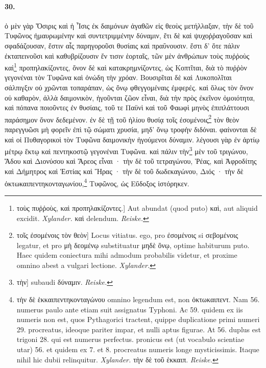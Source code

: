 \documentclass[a4paper, 11pt, oneside, polutonikogreek, german, landscape]{article}
\begin{document}
\paragraph{30.}
ὁ μὲν γὰρ Ὄσιρις καὶ ἡ Ἶσις ἐκ δαιμόνων ἀγαθῶν εἰς θεοὺς μετήλλαξαν, τὴν δὲ τοῦ Τυφῶνος ἠμαυρωμένην καὶ συντετριμμένην δύναμιν, ἔτι δὲ καὶ ψυχοῤῥαγοῦσαν καὶ σφαδάζουσαν, ἔστιν αἷς παρηγοροῦσι θυσίαις καὶ πραΰνουσιν. ἔστι δ' ὅτε πάλιν ἐκταπεινοῦσι καὶ καθυβρίζουσιν ἔν τισιν ἑορταῖς, τῶν μὲν ἀνθρώπων τοὺς πυῤῥοὺς καὶ\footnote{τοὺς πυῤῥοὺς, καὶ προπηλακίζοντες.] Aut abundat (quod puto) καὶ, aut aliquid excidit. \emph{Xylander.} καὶ delendum. \emph{Reiske.}} προπηλακίζοντες, ὄνον δὲ καὶ κατακρημνίζοντες, ὡς Κοπτῖται, διὰ τὸ πυῤῥὸν γεγονέναι τὸν Τυφῶνα καὶ ὀνώδη τὴν χρόαν. Βουσιρῖται δὲ καὶ Λυκοπολῖται σάλπιγξιν οὐ χρῶνται τοπαράπαν, ὡς ὄνῳ φθεγγομέναις ἐμφερές. καὶ ὅλως τὸν ὄνον οὐ καθαρὸν, ἀλλὰ δαιμονικὸν, ἡγοῦνται ζῶον εἶναι, διὰ τὴν πρὸς ἐκεῖνον ὁμοιότητα, καὶ πόπανα ποιοῦντες ἐν θυσίαις, τοῦ τε Παϋνὶ καὶ τοῦ Φαωφὶ μηνὸς ἐπιπλάττουσι παράσημον ὄνον δεδεμένον. ἐν δὲ τῇ τοῦ ἡλίου θυσίᾳ τοῖς ἐσομένοις\footnote{τοῖς ἐσομένοις τὸν θεὸν] Locus vitiatus. ego, pro ἐσομένοις si σεβομένοις legatur, et pro μὴ δεομένῳ substituatur μηδὲ ὂνῳ, optime habiturum puto. Haec quidem coniectura mihi admodum probabilis videtur, et proxime omnino abest a vulgari lectione. \emph{Xylander.}} τὸν θεὸν παρεγγυῶσι μὴ φορεῖν ἐπὶ τῷ σώματι χρυσία, μηδ' ὄνῳ τροφὴν διδόναι. φαίνονται δὲ καὶ οἱ Πυθαγορικοὶ τὸν Τυφῶνα δαιμονικὴν ἡγούμενοι δύναμιν. λέγουσι γὰρ ἐν ἀρτίῳ μέτρῳ ἕκτῳ καὶ πεντηκοστῷ γεγονέναι Τυφῶνα. καὶ πάλιν τὴν\footnote{τὴν] subaudi δύναμιν. \emph{Reiske.}} μὲν τοῦ τριγώνου, Ἅδου καὶ Διονύσου καὶ Ἄρεος εἶναι · τὴν δὲ τοῦ τετραγώνου, Ῥέας, καὶ Ἀφροδίτης καὶ Δήμητρος καὶ Ἑστίας καὶ Ἥρας · τὴν δὲ τοῦ δωδεκαγώνου, Διός · τὴν δὲ ὀκτωκαιπεντηκονταγωνίου,\footnote{τὴν δὲ ἑκκαιπεντηκονταγώνου omnino legendum est, non ὀκτωκαιπεντ. Nam 56. numerus paulo ante etiam suit assignatus Typhoni. Ac 59. quidem ex iis numeris non est, quos Pythagorici tractent, quippe duplicatione primi numeri 29. procreatus, ideoque pariter impar, et nulli aptus figurae. At 56. duplus est trigoni 28. qui est numerus perfectus. pronicus est (ut vocabulo scientiae utar) 56. et quidem ex 7. et 8. procreatus numeris longe mysticissimis. Itaque nihil hic dubii relinquitur. \emph{Xylander.} τὴν δὲ τοῦ ἑκκαιπ. \emph{Reiske.}} Τυφῶνος, ὡς Εὔδοξος ἱστόρηκεν.
\end{document}
